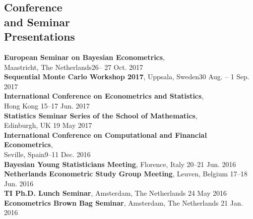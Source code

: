 \documentclass[margin,line]{resume}
\begin{document}
\begin{resume}
\section{\mysidestyle Conference \\and Seminar \\Presentations} 
	\textbf{ European Seminar on Bayesian Econometrics},\\
	 Maastricht, The Netherlands\hfill 26-- 27 Oct. 2017 \vspace{1mm} \\ 
	\textbf{Sequential Monte Carlo Workshop 2017}, Uppsala, Sweden\hfill 30 Aug. -- 1 Sep. 2017 \vspace{1mm} \\ 
	\textbf{ International Conference on Econometrics and Statistics},\\ Hong Kong \hfill 15--17 Jun. 2017 \vspace{1mm} \\ 
    \textbf{Statistics Seminar Series of the School of Mathematics},\\ Edinburgh, UK \hfill 19 May 2017 \vspace{1mm} \\ 
    \textbf{ International Conference on Computational and Financial Econometrics},\\ Seville, Spain\hfill 9--11 Dec. 2016\\ 
	\textbf{ Bayesian Young Statisticians Meeting}, Florence, Italy \hfill 20--21 Jun. 2016\\ 
    \textbf{ Netherlands Econometric Study Group Meeting}, Leuven, Belgium \hfill 17--18 Jun. 2016\\ 
     \textbf{TI Ph.D. Lunch Seminar}, Amsterdam, The Netherlands \hfill 24 May 2016\\ 
	\textbf{Econometrics Brown Bag Seminar}, Amsterdam, The Netherlands \hfill 21 Jan. 2016\\ 


\end{resume}
\end{document}
